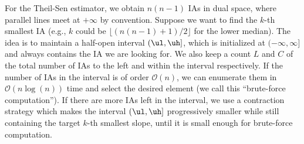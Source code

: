 For the Theil-Sen estimator, we obtain $n(n-1)$ IAs in dual space, where parallel lines meet at $+\infty$ by convention. Suppose we want to find the $k$-th smallest IA (e.g., $k$ could be $\lfloor (n(n-1)+1)/2\rfloor$ for the lower median). The idea is to maintain a half-open interval $(\ul,\uh]$, which is initialized at $(-\infty, \infty]$ and always contains the IA we are looking for. We also keep a count $L$ and $C$ of the total number of IAs to the left and within the interval respectively. If the number of IAs in the interval is of order $\mathcal{O}(n)$, we can enumerate them  in $\mathcal{O}(n\log(n))$ time and select the desired element (we call this ``brute-force computation''). If there are more IAs left in the interval, we use a contraction strategy which makes the interval $(\ul,\uh]$ progressively smaller while still containing the target $k$-th smallest slope, until it is small enough for brute-force computation.

